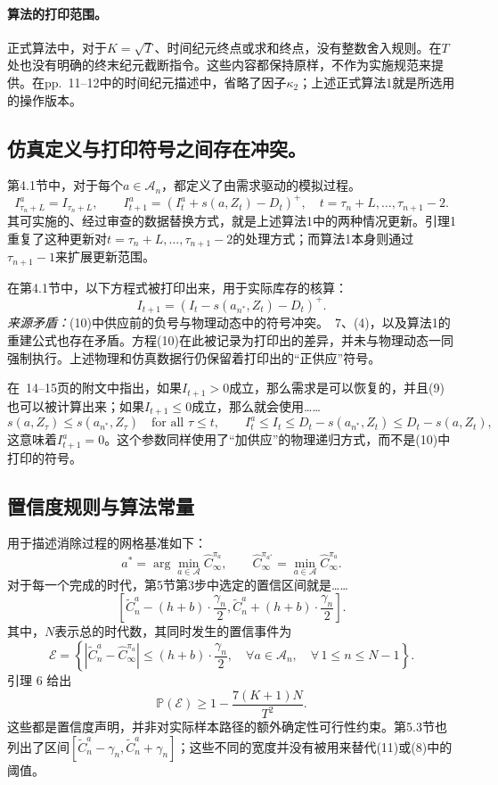 \documentclass{article}
\begin{document}
\paragraph{算法的打印范围。}
正式算法中，对于\(K=\sqrt T\)、时间纪元终点或求和终点，没有整数舍入规则。在\(T\)处也没有明确的终末纪元截断指令。这些内容都保持原样，不作为实施规范来提供。在pp.\ 11--12中的时间纪元描述中，省略了因子\(\kappa_2\)；上述正式算法1就是所选用的操作版本。

\subsection*{仿真定义与打印符号之间存在冲突。}
第4.1节中，对于每个\(a\in\mathcal A_n\)，都定义了由需求驱动的模拟过程。
\begin{equation}
I^a_{\tau_n+L}=I_{\tau_n+L},\qquad
I^a_{t+1}=(I^a_t+s(a,Z_t)-D_t)^+,
\quad t=\tau_n+L,\ldots,\tau_{n+1}-2.\tag{9}
\end{equation}
其可实施的、经过审查的数据替换方式，就是上述算法1中的两种情况更新。引理1重复了这种更新对\(t=\tau_n+L,\ldots,\tau_{n+1}-2\)的处理方式；而算法1本身则通过\(\tau_{n+1}-1\)来扩展更新范围。

在第4.1节中，以下方程式被打印出来，用于实际库存的核算：
\begin{equation}
I_{t+1}=(I_t-s(a_{n^*},Z_t)-D_t)^+.\tag{10, printed}
\end{equation}
\emph{来源矛盾：}(10)中供应前的负号与物理动态中的符号冲突。\ 7、(4)，以及算法1的重建公式也存在矛盾。方程(10)在此被记录为打印出的差异，并未与物理动态一同强制执行。上述物理和仿真数据行仍保留着打印出的“正供应”符号。

在\ 14--15页的附文中指出，如果\(I_{t+1}>0\)成立，那么需求是可以恢复的，并且(9)也可以被计算出来；如果\(I_{t+1}\leq0\)成立，那么就会使用……
\[
s(a,Z_\tau)\leq s(a_{n^*},Z_\tau)\quad\text{for all }\tau\leq t,
\qquad
I_t^a\leq I_t\leq D_t-s(a_{n^*},Z_t)\leq D_t-s(a,Z_t),
\]
这意味着\(I_{t+1}^a=0\)。这个参数同样使用了“加供应”的物理递归方式，而不是(10)中打印的符号。

\subsection*{置信度规则与算法常量}
用于描述消除过程的网格基准如下：
\[
a^*=\arg\min_{a\in\mathcal A}\hat C_\infty^{\pi_a},\qquad
\hat C_\infty^{\pi_{a^*}}=\min_{a\in\mathcal A}\hat C_\infty^{\pi_a}.
\]
对于每一个完成的时代，第5节第3步中选定的置信区间就是……
\[
\left[\tilde C_n^a-(h+b)\cdot\frac{\gamma_n}{2},
      \tilde C_n^a+(h+b)\cdot\frac{\gamma_n}{2}\right].
\]
其中，\(N\)表示总的时代数，其同时发生的置信事件为
\begin{equation}
\mathcal E=\left\{
\left|\tilde C_n^a-\hat C_\infty^{\pi_a}\right|
\leq(h+b)\cdot\frac{\gamma_n}{2},
\quad\forall a\in\mathcal A_n,\quad\forall\,1\leq n\leq N-1
\right\}.\tag{11}
\end{equation}
引理 6 给出
\[
\mathbb P(\mathcal E)\geq1-\frac{7(K+1)N}{T^2}.
\]
这些都是置信度声明，并非对实际样本路径的额外确定性可行性约束。第5.3节也列出了区间\([\tilde C_n^a-\gamma_n,\tilde C_n^a+\gamma_n]\)；这些不同的宽度并没有被用来替代(11)或(8)中的阈值。
\end{document}
